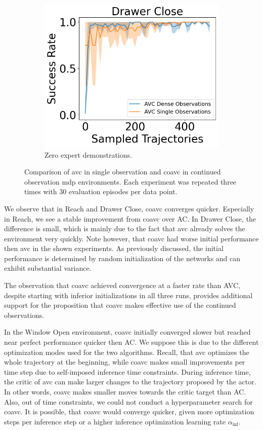 \begin{figure}[htbp]
\begin{subfigure}[t]{0.32\textwidth}
    \includegraphics[width=\textwidth]{images/dense_vs_sparse_0/Drawer Close.png}
    \caption{Zero expert demonstrations.}
  \end{subfigure}
  \caption{Comparison of \ac{avc} in single observation and \ac{coavc} in continued observation \ac{mdp} environments. Each experiment was repeated three times with 30 evaluation episodes per data point.
  }
  \label{fig:dense_vs_single}
\end{figure}

We observe that in Reach and Drawer Close, \ac{coavc} converges quicker. Especially in Reach, we see a stable improvement from \ac{coavc} over AC. In Drawer Close, the difference is 
small, which is mainly due to the fact that \ac{avc} already solves the environment very quickly. Note however, that \ac{coavc} had worse initial performance then \ac{avc} in the shown experiments. 
As previously discussed, the initial performance is determined by random initialization of the networks and can exhibit substantial 
variance.

The observation that \ac{coavc} achieved convergence at a faster rate than AVC, despite starting with inferior initializations in 
all three runs, provides additional support for the proposition that \ac{coavc} makes effective use of the continued observations.

In the Window Open environment, \ac{coavc} initially converged slower but 
reached near perfect performance quicker then AC. We suppose this is due to the different optimization modes used for the two algorithms. Recall, that \ac{avc} optimizes the whole 
trajectory at the beginning, while \ac{coavc} makes small improvements per time step due to self-imposed inference time constraints. During inference time, the critic of 
\ac{avc} can make larger changes to the trajectory proposed by the actor. In other words, \ac{coavc} makes smaller moves towards the critic target than AC. Also, out of time constraints, we could 
not conduct a hyperparameter search for \ac{coavc}. It is possible, that \ac{coavc} would converge quicker, given more optimization steps per inference step or a higher inference optimization 
learning rate $\alpha_{\mathrm{inf}}$.

